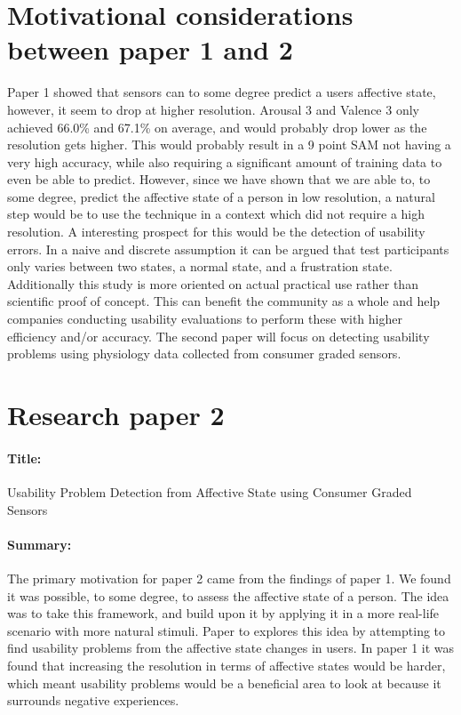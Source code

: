 \section{Motivational considerations between paper 1 and 2}
Paper 1 showed that sensors can to some degree predict a users affective state, however, it seem to drop at higher resolution. 
Arousal 3 and Valence 3 only achieved 66.0\% and 67.1\% on average, and would probably drop lower as the resolution gets higher. 
This would probably result in a 9 point SAM not having a very high accuracy, while also requiring a significant amount of training data to even be able to predict.
However, since we have shown that we are able to, to some degree, predict the affective state of a person in low resolution, a natural step would be to use the technique in a context which did not require a high resolution. 
A interesting prospect for this would be the detection of usability errors.
In a naive and discrete assumption it can be argued that test participants only varies between two states, a normal state, and a frustration state.
Additionally this study is more oriented on actual practical use rather than scientific proof of concept. 
This can benefit the community as a whole and help companies conducting usability evaluations to perform these with higher efficiency and/or accuracy.
The second paper will focus on detecting usability problems using physiology data collected from consumer graded sensors.

\section{Research paper 2}
\paragraph{Title:}
Usability Problem Detection from Affective State using Consumer Graded Sensors
\paragraph{Summary:}
The primary motivation for paper 2 came from the findings of paper 1. 
We found it was possible, to some degree, to assess the affective state of a person.
The idea was to take this framework, and build upon it by applying it in a more real-life scenario with more natural stimuli.
Paper to explores this idea by attempting to find usability problems from the affective state changes in users. 
In paper 1 it was found that increasing the resolution in terms of affective states would be harder, which meant usability problems would be a beneficial area to look at because it surrounds negative experiences.

